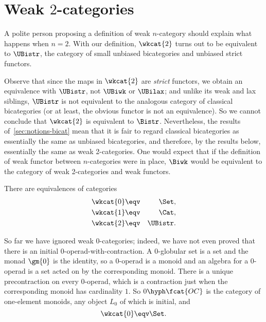 \section{Weak $2$-categories}
%
%
%


A polite person proposing a definition of weak $n$-category should explain
what happens when $n=2$.  With our definition, $\wkcat{2}$ turns out to be
equivalent to $\UBistr$, the category of small unbiased bicategories and
unbiased strict functors.

Observe that since the maps in $\wkcat{2}$ are \emph{strict} functors, we
obtain an equivalence with $\UBistr$, not $\UBiwk$ or $\UBilax$; and unlike
its weak and lax siblings, $\UBistr$ is not equivalent to the analogous
category of classical%
%
%
bicategories (or at least, the obvious functor is not
an equivalence).  So we cannot conclude that $\wkcat{2}$ is equivalent to
$\Bistr$.  Nevertheless, the results of~\ref{sec:notions-bicat} mean that
it is fair to regard classical bicategories as essentially the same as
unbiased bicategories, and therefore, by the results below, essentially the
same as weak 2-categories.  One would expect that if the definition of weak
functor between $n$-categories were in place, $\Biwk$ would be equivalent
to the category of weak 2-categories and weak functors.

\begin{thm}	
There are equivalences of categories
%
\begin{eqnarray*}
\wkcat{0}	&\eqv	&\Set,	\\
\wkcat{1}	&\eqv	&\Cat,	\\
\wkcat{2}	&\eqv	&\UBistr.
\end{eqnarray*}
\end{thm}

So far we have ignored weak $0$-categories;%
%
%
indeed, we have not even proved
that there is an initial 0-operad-with-contraction.  A $0$-globular set is
a set and the monad $\gm{0}$ is the identity, so a $0$-operad is a monoid
and an algebra for a $0$-operad is a set acted on by the corresponding
monoid.  There is a unique precontraction on every $0$-operad, which is a
contraction just when the corresponding monoid has cardinality $1$.  So
$0\hyph\fcat{OC}$ is the category of one-element monoids, any object $L_0$
of which is initial, and
\[
\wkcat{0} \eqv \Set.
\]

